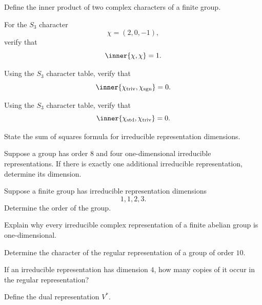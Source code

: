 \begin{exercise}[1]
Define the inner product of two complex characters of a finite group.
\end{exercise}

\begin{exercise}[2]
For the \(S_3\) character
\[ \chi=(2,0,-1), \]
verify that
\[ \inner{\chi,\chi}=1. \]
\end{exercise}

\begin{exercise}[2]
Using the \(S_3\) character table, verify that
\[ \inner{\chi_{\mathrm{triv}},\chi_{\mathrm{sgn}}}=0. \]
\end{exercise}

\begin{exercise}[2]
Using the \(S_3\) character table, verify that
\[ \inner{\chi_{\mathrm{std}},\chi_{\mathrm{triv}}}=0. \]
\end{exercise}

\begin{exercise}[1]
State the sum of squares formula for irreducible representation dimensions.
\end{exercise}

\begin{exercise}[2]
Suppose a group has order \(8\) and four one-dimensional irreducible
representations. If there is exactly one additional irreducible
representation, determine its dimension.
\end{exercise}

\begin{exercise}[2]
Suppose a finite group has irreducible representation dimensions
\[ 1,1,2,3. \]
Determine the order of the group.
\end{exercise}

\begin{exercise}[2]
Explain why every irreducible complex representation of a finite abelian
group is one-dimensional.
\end{exercise}

\begin{exercise}[2]
Determine the character of the regular representation of a group of order
\(10\).
\end{exercise}

\begin{exercise}[2]
If an irreducible representation has dimension \(4\), how many copies of it
occur in the regular representation?
\end{exercise}

\begin{exercise}[1]
Define the dual representation \(V^*\).
\end{exercise}

